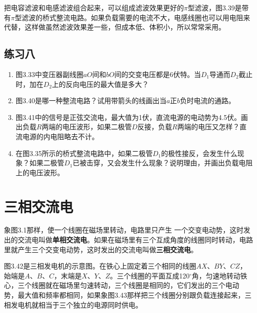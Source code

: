 把电容滤波和电感滤波组合起来，可以组成滤波效果更好的$\pi$型滤波，图3.39是带有$\pi$型滤波的桥式整流电路。如果负载需要的电流不大，电感线圈也可以用电阻来代替，这样做虽然滤波效果差一些，但成本低、体积小，所以常常采用。

\subsection*{练习八}
\begin{enumerate}
	\item 图3.33中变压器副线圈$aO$间和$bO$间的交变电压都是6伏特。当$D_1$导通而$D_2$截止时，加在$D_2$上的反向电压的最大值是多大？
	\item 图3.40是哪一种整流电路？试用带箭头的线画出当$a$正$b$负时电流的通路。
	\item 图3.41中的信号是正弦交流电，最大值为1伏，直流电源的电动势为4.5伏。画出负载$R$两端的电压波形，如果二极管$D$反接，负载$R$两端的电压又怎样？直流电源的内电阻略去不计。
	\item 在图3.35所示的桥式整流电路中，如果二极管$D_1$的极性接反，会发生什么现象？如果二极管$D_1$已被击穿，又会发生什么现象？说明理由，并画出负载电阻上的电压波形。
\end{enumerate}

	
\section{三相交流电}
象图3.1那样，使一个线圈在磁场里转动，电路里只产生
一个交变电动势，这时发出的交流电叫做\textbf{单相交流电}。如果在磁场里有三个互成角度的线圈同时转动，电路里就产生三个交变电动势，这时发出的交流电叫做\textbf{三相交流电}。

图3.42是三相发电机的示意图。在铁心上固定着三个相同的线圈$AX$、$BY$、$CZ$，始端是$A$、$B$、$C$，末端是$X$、$Y$、$Z$。三个线圈的平面互成120$^\circ$角，匀速地转动铁心，三个线圈就在磁场里匀速转动，三个线圈是相同的，它们发出的三个电动
势，最大值和频率都相同，如果象图3.43那样把三个线圈分别跟负载连接起来，三相发电机就相当于三个独立的电源同时供电。

